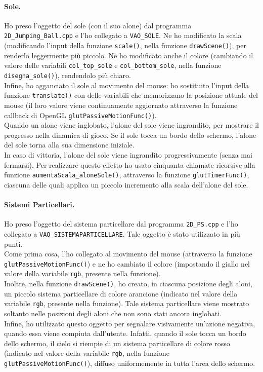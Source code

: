 \documentclass[a4paper, 12pt]{article}
\begin{document}
\paragraph{Sole.}
Ho preso l'oggetto del sole (con il suo alone) dal programma \texttt{ \allowbreak 2D\_Jumping\_Ball.cpp} e l'ho collegato a \texttt{VAO\_SOLE}. Ne ho modificato la scala (modificando l'input della funzione \texttt{scale()}, nella funzione \texttt{drawScene()}), per renderlo leggermente più piccolo. Ne ho modificato anche il colore (cambiando il valore delle variabili \texttt{col\_top\_sole} e \texttt{col\_bottom\_sole}, nella funzione \texttt{disegna\_sole()}), rendendolo più chiaro.\\
Infine, ho agganciato il sole al movimento del mouse: ho sostituito l'input della funzione \texttt{translate()} con delle variabili che memorizzano la posizione attuale del mouse (il loro valore viene continuamente aggiornato attraverso la funzione callback di OpenGL \texttt{glutPassiveMotionFunc()}).\\
Quando un alone viene inglobato, l'alone del sole viene ingrandito, per mostrare il progresso nella dinamica di gioco. Se il sole tocca un bordo dello schermo, l'alone del sole torna alla sua dimensione iniziale.\\
In caso di vittoria, l'alone del sole viene ingrandito progressivamente (senza mai fermarsi). Per realizzare questo effetto ho usato cinquanta chiamate ricorsive alla funzione \texttt{aumentaScala\_aloneSole()}, attraverso la funzione \texttt{glutTimerFunc()}, ciascuna delle quali applica un piccolo incremento alla scala dell'alone del sole.

\paragraph{Sistemi Particellari.}
Ho preso l'oggetto del sistema particellare dal programma \texttt{2D\_PS.cpp} e l'ho collegato a \texttt{VAO\_SISTEMAPARTICELLARE}. Tale oggetto è stato utilizzato in più punti.\\
Come prima cosa, l'ho collegato al movimento del mouse (attraverso la funzione \texttt{glutPassiveMotionFunc()}) e ne ho cambiato il colore (impostando il giallo nel valore della variabile \texttt{rgb}, presente nella funzione).\\
Inoltre, nella funzione \texttt{drawScene()}, ho creato, in ciascuna posizione degli aloni, un piccolo sistema particellare di colore arancione (indicato nel valore della variabile \texttt{rgb}, presente nella funzione). Tale sistema particellare viene mostrato soltanto nelle posizioni degli aloni che non sono stati ancora inglobati.\\
Infine, ho utilizzato questo oggetto per segnalare visivamente un'azione negativa, quando essa viene compiuta dall'utente. Infatti, quando il sole tocca un bordo dello schermo, il cielo si riempie di un sistema particellare di colore rosso (indicato nel valore della variabile \texttt{rgb}, nella funzione \texttt{glutPassiveMotionFunc()}), diffuso uniformemente in tutta l'area dello schermo.
\end{document}
